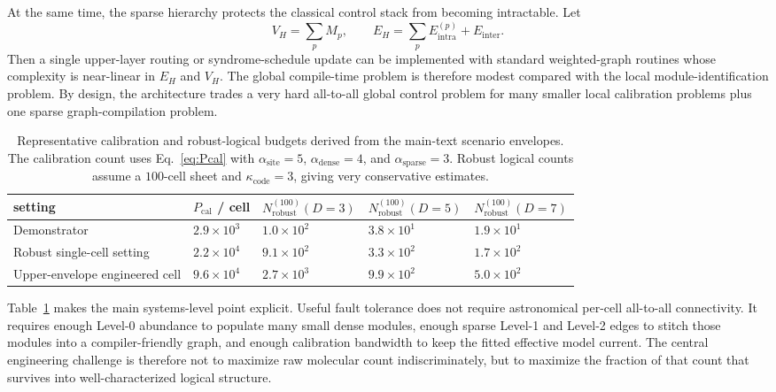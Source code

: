 \documentclass[11pt]{report}
\theoremstyle{definition}
\begin{document}
At the same time, the sparse hierarchy protects the classical control stack from becoming intractable. Let
\[
V_H = \sum_p M_p,
\qquad
E_H = \sum_p E^{(p)}_{\mathrm{intra}} + E_{\mathrm{inter}}.
\]
Then a single upper-layer routing or syndrome-schedule update can be implemented with standard weighted-graph routines whose complexity is near-linear in $E_H$ and $V_H$. The global compile-time problem is therefore modest compared with the local module-identification problem. By design, the architecture trades a very hard all-to-all global control problem for many smaller local calibration problems plus one sparse graph-compilation problem.

\begin{table}[ht]
\centering
\scriptsize
\caption{Representative calibration and robust-logical budgets derived from the main-text scenario envelopes. The calibration count uses Eq.~\eqref{eq:Pcal} with $\alpha_{\mathrm{site}}=5$, $\alpha_{\mathrm{dense}}=4$, and $\alpha_{\mathrm{sparse}}=3$. Robust logical counts assume a $100$-cell sheet and $\kappa_{\mathrm{code}}=3$, giving very conservative estimates.}
\begin{tabularx}{\textwidth}{>{\raggedright\arraybackslash}p{2.4cm} >{\centering\arraybackslash}p{2.1cm} >{\centering\arraybackslash}p{1.8cm} >{\centering\arraybackslash}p{1.8cm} X}
\toprule
setting & $P_{\mathrm{cal}}$ / cell & $N_{\mathrm{robust}}^{(100)}(D=3)$ & $N_{\mathrm{robust}}^{(100)}(D=5)$ & $N_{\mathrm{robust}}^{(100)}(D=7)$ \\
\midrule
Demonstrator & $2.9\times10^3$ & $1.0\times10^2$ & $3.8\times10^1$ & $1.9\times10^1$ \\
Robust single-cell setting & $2.2\times10^4$ & $9.1\times10^2$ & $3.3\times10^2$ & $1.7\times10^2$ \\
Upper-envelope engineered cell & $9.6\times10^4$ & $2.7\times10^3$ & $9.9\times10^2$ & $5.0\times10^2$ \\
\bottomrule
\end{tabularx}
\label{tab:appendix-resource}
\end{table}

Table~\ref{tab:appendix-resource} makes the main systems-level point explicit. Useful fault tolerance does not require astronomical per-cell all-to-all connectivity. It requires enough Level-0 abundance to populate many small dense modules, enough sparse Level-1 and Level-2 edges to stitch those modules into a compiler-friendly graph, and enough calibration bandwidth to keep the fitted effective model current. The central engineering challenge is therefore not to maximize raw molecular count indiscriminately, but to maximize the fraction of that count that survives into well-characterized logical structure.
\end{document}
